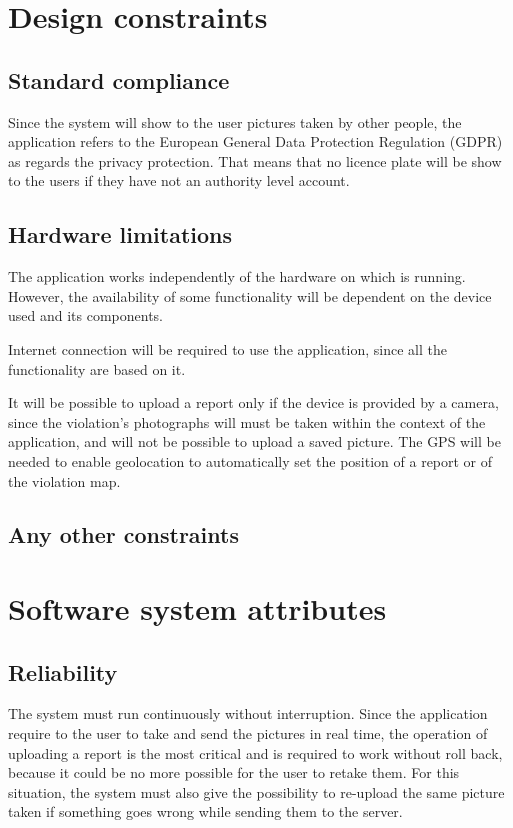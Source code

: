 \documentclass[../RASD.tex]{subfiles}
\begin{document}
    \section{Design constraints}\label{sec:design-constraints}
            \subsection{Standard compliance}\label{subsec:standard-compliance}
    Since the system will show to the user pictures taken by other people, the application refers to the European General Data Protection Regulation (GDPR) as regards the privacy protection. That means that no licence plate will be show to the users if they have not an authority level account.
    \subsection{Hardware limitations}\label{subsec:hardware-limitations}
    The application works independently of the hardware on which is running. However, the availability of some functionality will be dependent on the device used and its components.

    Internet connection will be required to use the application, since all the functionality are based on it.

    It will be possible to upload a report only if the device is provided by a camera, since the violation's photographs will must be taken within the context of the application, and will not be possible to upload a saved picture. The GPS will be needed to enable geolocation to automatically set the position of a report or of the violation map.
    \subsection{Any other constraints}\label{subsec:any-other-constraints}
        \section{Software system attributes}\label{sec:software-system-attributes}
            \subsection{Reliability}\label{subsec:reliability}
    The system must run continuously without interruption. Since the application require to the user to take and send the pictures in real time, the operation of uploading a report is the most critical and is required to work without roll back, because it could be no more possible for the user to retake them. For this situation, the system must also give the possibility to re-upload the same picture taken if something goes wrong while sending them to the server.
\end{document}

